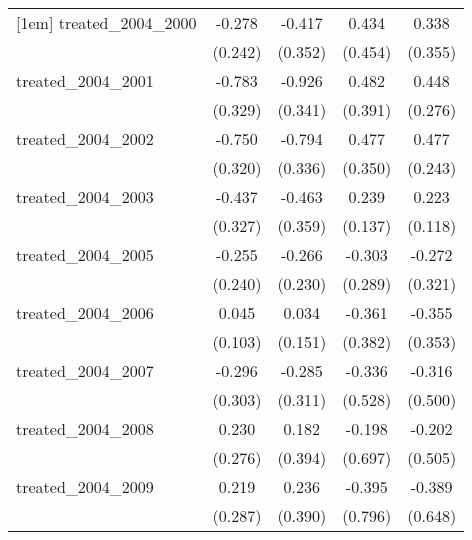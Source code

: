 {\begin{tabular}{l*{4}{c}}
[1em]
treated\_2004\_2000&      -0.278         &      -0.417         &       0.434         &       0.338         \\
            &     (0.242)         &     (0.352)         &     (0.454)         &     (0.355)         \\
[1em]
treated\_2004\_2001&      -0.783\sym{*}  &      -0.926\sym{**} &       0.482         &       0.448         \\
            &     (0.329)         &     (0.341)         &     (0.391)         &     (0.276)         \\
[1em]
treated\_2004\_2002&      -0.750\sym{*}  &      -0.794\sym{*}  &       0.477         &       0.477\sym{*}  \\
            &     (0.320)         &     (0.336)         &     (0.350)         &     (0.243)         \\
[1em]
treated\_2004\_2003&      -0.437         &      -0.463         &       0.239         &       0.223         \\
            &     (0.327)         &     (0.359)         &     (0.137)         &     (0.118)         \\
[1em]
treated\_2004\_2005&      -0.255         &      -0.266         &      -0.303         &      -0.272         \\
            &     (0.240)         &     (0.230)         &     (0.289)         &     (0.321)         \\
[1em]
treated\_2004\_2006&       0.045         &       0.034         &      -0.361         &      -0.355         \\
            &     (0.103)         &     (0.151)         &     (0.382)         &     (0.353)         \\
[1em]
treated\_2004\_2007&      -0.296         &      -0.285         &      -0.336         &      -0.316         \\
            &     (0.303)         &     (0.311)         &     (0.528)         &     (0.500)         \\
[1em]
treated\_2004\_2008&       0.230         &       0.182         &      -0.198         &      -0.202         \\
            &     (0.276)         &     (0.394)         &     (0.697)         &     (0.505)         \\
[1em]
treated\_2004\_2009&       0.219         &       0.236         &      -0.395         &      -0.389         \\
            &     (0.287)         &     (0.390)         &     (0.796)         &     (0.648)         \\

\end{tabular}}
